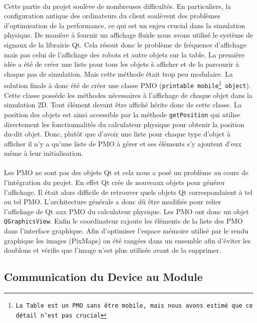 \paragraph{}
Cette partie du projet soulève de nombreuses difficultés. En particuliers, la configuration antique des ordinateurs du client soulèvent des problèmes d'optimisation de la performance, ce qui est un enjeu crucial dans la simulation physique. De manière à fournir un affichage fluide nous avons utilisé le système de signaux de la librairie Qt. Cela résout donc le problème de fréquence d'affichage mais pas celui de l'affichage des robots et autre objets sur la table. La première idée a été de créer une liste pour tous les objets à afficher et de la parcourir à chaque pas de simulation. Mais cette méthode était trop peu modulaire. La solution finale à donc été de créer une classe PMO (\texttt{printable mobile\footnote{La Table est un PMO sans être mobile, mais nous avons estimé que ce détail n'est pas crucial} object}). Cette classe possède les méthodes nécessaires à l'affichage de chaque objet dans la simulation 2D. Tout élément devant être affiché hérite donc de cette classe. La position des objets est ainsi accessible par la méthode \texttt{getPosition} qui utilise directement les fonctionnalités du calculateur physique pour obtenir la position du-dit objet. Donc, plutôt que d'avoir une liste pour chaque type d'objet à afficher il n'y a qu'une liste de PMO à gérer et ses éléments s'y ajoutent d'eux même à leur initialisation.

\paragraph{}
Les PMO ne sont pas des objets Qt et cela nous a posé un problème au cours de l'intégration du projet. En effet Qt crée de nouveaux objets pour générer l'affichage. Il était alors difficile de retrouver quels objets Qt correspondaient à tel ou tel PMO. L'architecture générale a donc dû être modifiée pour relier l'affichage de Qt aux PMO du calculateur physique. Les PMO ont donc un objet \texttt{QGraphicsView}. Enfin le coordinateur rajoute les éléments de la liste des PMO dans l'interface graphique. Afin d'optimiser l'espace mémoire utilisé par le rendu graphique les images (PixMaps) on été rangées dans un ensemble afin d'éviter les doublons et vérifie que l'image n'est plus utilisée avant de la supprimer.

\subsection{Communication du Device au Module}

